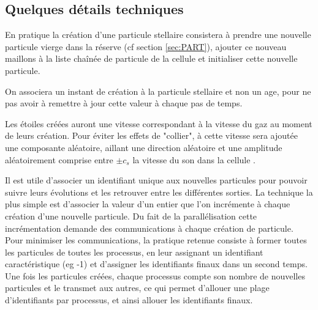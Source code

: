 \subsection{Quelques détails techniques}

En pratique la création d'une particule stellaire consistera à prendre une nouvelle particule vierge dans la réserve (cf section \ref{sec:PART}), ajouter ce nouveau maillons à la liste chaînée de particule de la cellule et initialiser cette nouvelle particule.

On associera un instant de création à la particule stellaire et non un age, pour ne pas avoir à remettre à jour cette valeur à chaque pas de temps.

Les étoiles créées auront une vitesse correspondant à la vitesse du gaz au moment de leurs création.
Pour éviter les effets de "collier", à cette vitesse sera ajoutée une composante aléatoire, aillant une direction aléatoire et une amplitude aléatoirement comprise entre $\pm c_s$ la vitesse du son dans la cellule \citep{rasera_history_2006}.

Il est utile d'associer un identifiant unique aux nouvelles particules pour pouvoir suivre leurs évolutions et les retrouver entre les différentes sorties.
La technique la plus simple est d'associer la valeur d'un entier que l'on incrémente à chaque création d'une nouvelle particule.
Du fait de la parallélisation cette incrémentation demande des communications à chaque création de particule.
Pour minimiser les communications, la pratique retenue consiste à former toutes les particules de toutes les processus, en leur assignant un identifiant caractéristique (eg -1) et d'assigner les identifiants finaux dans un second temps.
Une fois les particules créées, chaque processus compte son nombre de nouvelles particules et le transmet aux autres, ce qui permet d'allouer une plage d'identifiants par processus, et ainsi allouer les identifiants finaux.




